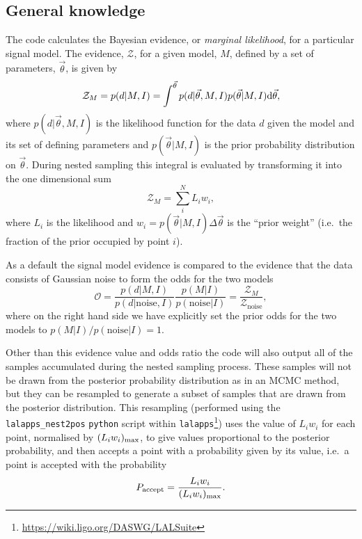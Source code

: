 \subsection{General knowledge}\label{sec:general}

The code calculates the Bayesian evidence, or {\it marginal likelihood}, for a particular signal model. The
evidence, $\mathcal{Z}$, for a given model, $M$, defined by a set of parameters, $\vec{\theta}$, is given by
\begin{equation}\label{eq:evidence}
\mathcal{Z}_M = p(d|M,I) = \int^{\vec{\theta}} p(d|\vec{\theta},M,I)p(\vec{\theta}|M,I) {\rm d}\vec{\theta},
\end{equation}
where $p(d|\vec{\theta},M,I)$ is the likelihood function for the data $d$ given the
model and its set of defining parameters and $p(\vec{\theta}|M,I)$ is the prior probability distribution on
$\vec{\theta}$. During nested sampling this integral is evaluated by transforming it into the one dimensional
sum
\begin{equation}\label{eq:nestedsampev}
\mathcal{Z}_M = \sum_i^N L_i w_i,
\end{equation}
where $L_i$ is the likelihood and $w_i = p(\vec{\theta}|M,I) \Delta\vec{\theta}$ is the ``prior weight''
(i.e.\ the fraction of the prior occupied by point $i$).

As a default the signal model evidence is compared to the
evidence that the data consists of Gaussian noise to form the odds for the two models
\begin{equation}\label{eq:oddsratio}
\mathcal{O} = \frac{p(d|M,I)}{p(d|\text{noise},I)}\frac{p(M|I)}{p(\text{noise}|I)} =
\frac{\mathcal{Z}_M}{\mathcal{Z}_{\text{noise}}},
\end{equation}
where on the right hand side we have explicitly set the prior odds for the two models to
$p(M|I)/p(\text{noise}|I) = 1$.

Other than this evidence value and odds ratio the code will also output all of the samples accumulated during
the nested sampling process. These samples will not be drawn from the posterior probability distribution as in
an MCMC method, but they can be resampled to generate a subset of samples that are drawn from the posterior
distribution. This resampling (performed using the {\tt lalapps\_nest2pos} {\tt python} script within
{\tt lalapps}\footnote{\url{https://wiki.ligo.org/DASWG/LALSuite}}) uses the
value of $L_i w_i$ for each point, normalised by $(L_iw_i)_{\rm max}$, to give values proportional to the
posterior probability, and then accepts a point with a probability given by its value, i.e.\ a point is
accepted with the probability
\begin{equation}\label{eq:postaccept}
P_{\text{accept}} = \frac{L_i w_i}{(L_iw_i)_{\rm max}}.
\end{equation}


